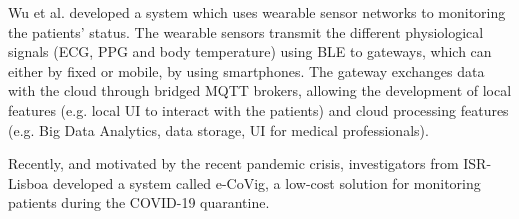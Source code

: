 %
%
%
%
%
%
%

Wu et al. \cite{Wu2020} developed a system which uses wearable sensor networks to monitoring the patients' status. The wearable sensors transmit the different physiological signals (ECG, PPG and body temperature) using BLE to gateways, which can either by fixed or mobile, by using smartphones. The gateway exchanges data with the cloud through bridged MQTT brokers, allowing the development of local features (e.g. local UI to interact with the patients) and cloud processing features (e.g. Big Data Analytics, data storage, UI for medical professionals). 

%
%
%
%
%
Recently, and motivated by the recent pandemic crisis, investigators from ISR-Lisboa developed a system called e-CoVig, a low-cost solution for monitoring patients during the COVID-19 quarantine. 

%
%
%
%


